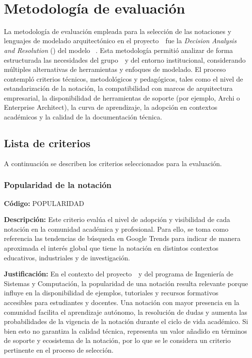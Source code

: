 \label{cap:dar}
\mbox{}\\


\section{Metodología de evaluación}

La metodología de evaluación empleada para la selección de las notaciones y lenguajes de modelado arquitectónico en el proyecto~\NDITI~fue la \textit{Decision Analysis and Resolution} (\DAR) del modelo \CMMI~\citep{CMMIInstitute2010}. Esta metodología permitió analizar de forma estructurada las necesidades del grupo~\GRID~y del entorno institucional, considerando múltiples alternativas de herramientas y enfoques de modelado. El proceso contempló criterios técnicos, metodológicos y pedagógicos, tales como el nivel de estandarización de la notación, la compatibilidad con marcos de arquitectura empresarial, la disponibilidad de herramientas de soporte (por ejemplo, Archi o Enterprise Architect), la curva de aprendizaje, la adopción en contextos académicos y la calidad de la documentación técnica.

\subsection{Lista de criterios}
A continuación se describen los criterios seleccionados para la evaluación.

\subsubsection{Popularidad de la notación}
\textbf{Código:} POPULARIDAD

\textbf{Descripción:} Este criterio evalúa el nivel de adopción y visibilidad de cada notación en la comunidad académica 
y profesional. Para ello, se toma como referencia las tendencias de búsqueda en Google Trends para indicar de manera 
aproximada el interés global que tiene la notación en distintos contextos educativos, industriales y de investigación.

\textbf{Justificación:} En el contexto del proyecto~\NDITI~y del programa de Ingeniería de Sistemas y Computación, 
la popularidad de una notación resulta relevante porque influye en la disponibilidad de ejemplos, tutoriales 
y recursos formativos accesibles para estudiantes y docentes. Una notación con mayor presencia en la comunidad facilita 
el aprendizaje autónomo, la resolución de dudas y aumenta las probabilidades de la vigencia de la notación durante el ciclo 
de vida académico. Si bien esto no garantiza la calidad técnica, representa un valor añadido en términos de soporte
y ecosistema de la notación, por lo que se le considera un criterio pertinente en el proceso de selección.


